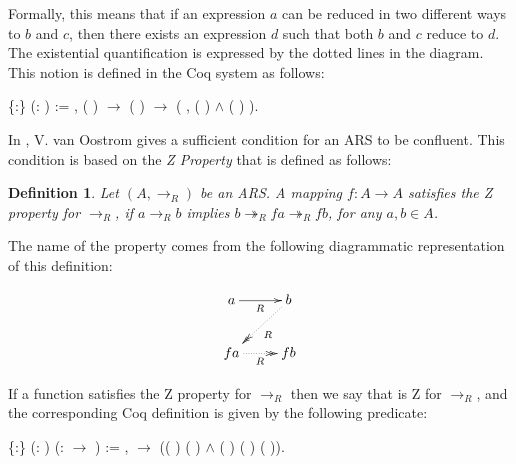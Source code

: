 \documentclass[a4paper]{article}
\newcommand{\tto}{\twoheadrightarrow}
\newtheorem{definition}{Definition}[section]
\begin{document}
Formally, this means that if an expression $a$ can be reduced in two
different ways to $b$ and $c$, then there exists an expression $d$
such that both $b$ and $c$ reduce to $d$. The existential
quantification is expressed by the dotted lines in the diagram. This
notion is defined in the Coq system as follows: \begin{coqdoccode}
  \coqdocemptyline \coqdocnoindent {}
   \{:\} (:
   ) := \coqdockw{\ensuremath{\forall}}
    , (
  )   \ensuremath{\rightarrow}
  ( )  
  \ensuremath{\rightarrow} (\coqdoctac{\ensuremath{\exists}}
  , ( ) 
   \ensuremath{\land} (
  )  ).\coqdoceol
  \coqdocemptyline
\end{coqdoccode}

In \cite{dehornoy2008z}, V. van Oostrom gives a sufficient condition
for an ARS to be confluent. This condition is based on the \textit{Z
  Property} that is defined as follows:


\begin{definition} Let $(A,\to_R)$ be an ARS. A mapping $f:A \to A$ 
  satisfies the Z property for $\to_R$, if $a \to_R b$ implies
  $b \tto_R f a  \tto_R f b$, for any $a, b \in A$. 
\end{definition}

The name of the property comes from the following diagrammatic
representation of this definition:
    
\[ \xymatrix{ a \ar[r]_R & b \ar@{.>>}[dl]^R\\ f a \ar@{.>>}[r]_R & f
    b \\ } \]

If a function  satisfies the Z property for $\to_R$ then
we say that  is Z for $\to_R$, and the corresponding Coq
definition is given by the following predicate:

\begin{coqdoccode}
  \coqdocemptyline \coqdocnoindent {}
   \{:\}
  (:  ) (:
   \ensuremath{\rightarrow} ) :=
  \coqdockw{\ensuremath{\forall}}  ,
     \ensuremath{\rightarrow}
  (( )  (
  ) \ensuremath{\land} (
  ) ( ) (
  )).\coqdoceol \coqdocemptyline
\end{coqdoccode}
\end{document}
